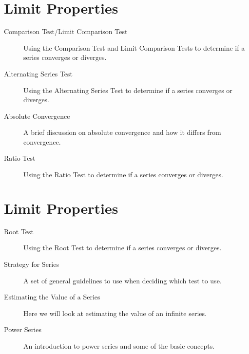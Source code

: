 \documentclass{beamer}
\begin{document}
	
	\section{Limit Properties}
	
	\begin{description}
		\item[Comparison Test/Limit Comparison Test]  Using the Comparison Test and Limit Comparison Tests to determine if a series converges or diverges.
		
		\item[Alternating Series Test]  Using the Alternating Series Test to determine if a series converges or diverges.
		
		\item[Absolute Convergence]  A brief discussion on absolute convergence and how it differs from convergence.
		
		\item[Ratio Test]  Using the Ratio Test to determine if a series converges or diverges.
	\end{description}
	
	
	\section{Limit Properties}
	
	\begin{description}
		\item[Root Test]  Using the Root Test to determine if a series converges or diverges.
		
		\item[Strategy for Series]  A set of general guidelines to use when deciding which test to use.
		
		\item[Estimating the Value of a Series]  Here we will look at estimating the value of an infinite series.
		
		\item[Power Series]  An introduction to power series and some of the basic concepts.
		
	\end{description}
	
	
\end{document}
